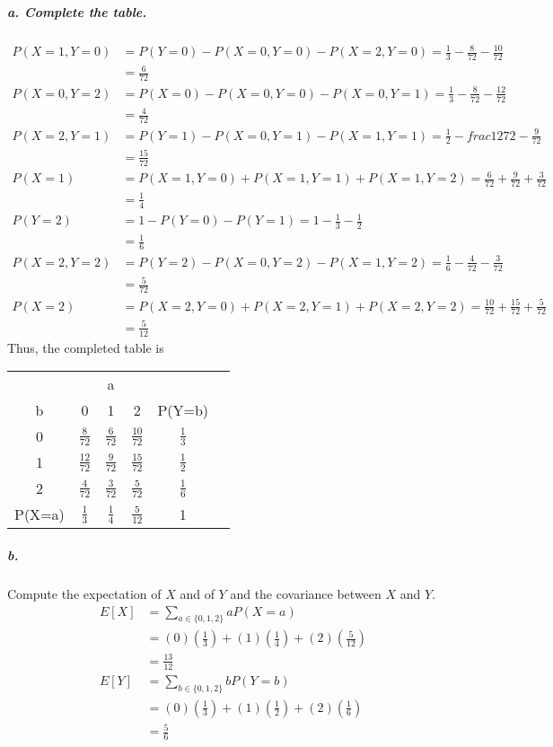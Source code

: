 \documentclass{article} %
\begin{document}
\subparagraph*{a. Complete the table.}
\begin{align*}
P(X=1, Y= 0) & = P(Y=0) - P(X= 0, Y = 0) - P(X = 2, Y = 0) = \frac{1}{3} - \frac{8}{72} - \frac{10}{72} \\
& = \frac{6}{72} \\
P(X = 0, Y = 2) & = P(X = 0) - P(X = 0, Y = 0) - P(X= 0, Y = 1) = \frac{1}{3} - \frac{8}{72} - \frac{12}{72} \\
& = \frac{4}{72} \\
P(X = 2, Y = 1) & = P(Y = 1) - P(X = 0, Y = 1) - P(X = 1, Y = 1) = \frac{1}{2} - frac{12}{72} - \frac{9}{72} \\
& = \frac{15}{72} \\
P(X = 1) & = P(X = 1, Y = 0) + P(X = 1, Y = 1) + P(X = 1, Y = 2) = \frac{6}{72} + \frac{9}{72} + \frac{3}{72} \\
& = \frac{1}{4} \\
P(Y = 2) &  = 1 - P(Y = 0) - P(Y = 1) = 1 - \frac{1}{3} - \frac{1}{2} \\
& = \frac{1}{6} \\
P(X = 2, Y = 2) & = P(Y = 2) - P(X = 0, Y = 2) - P(X = 1, Y = 2)  = \frac{1}{6} - \frac{4}{72} - \frac{3}{72} \\
& = \frac{5}{72} \\
P(X = 2) & = P(X = 2, Y = 0) + P(X = 2, Y = 1) + P(X = 2, Y = 2) = \frac{10}{72} + \frac{15}{72} + \frac{5}{72} \\
& = \frac{5}{12}
\end{align*}
Thus, the completed table is 
\begin{table}[h!]
\centering
\renewcommand{\arraystretch}{1.5}
\begin{tabular}{cccccc}
\hline \hline 
 &  \multicolumn{3}{c}{a} \\ \cline{2-4} 
b & 0 & 1 & 2 & P(Y=b) \\ \hline
0 & $\frac{8}{72}$ & $\frac{6}{72}$ & $\frac{10}{72}$ & $\frac{1}{3}$ \\ 
1 & $\frac{12}{72}$ & $\frac{9}{72}$ & $\frac{15}{72}$ & $\frac{1}{2}$ \\  
2 & $\frac{4}{72}$ & $\frac{3}{72}$ & $\frac{5}{72}$ & $\frac{1}{6}$ \\ \hline
P(X=a) & $\frac{1}{3}$ & $\frac{1}{4}$ &  $\frac{5}{12}$ & 1 \\ \hline \hline
\end{tabular}
\end{table}

\subparagraph*{b.} Compute the expectation of $X$ and of $Y$ and the covariance between $X$ and $Y$.  
\begin{align*}
E[X]  & = \sum_{a \in \{0, 1, 2\}} aP(X = a) \\
& = (0)(\frac{1}{3}) + (1)(\frac{1}{4}) + (2)(\frac{5}{12}) \\
& = \frac{13}{12} \\
E[Y] & = \sum_{b \in \{0, 1, 2\}} b P(Y=b) \\
& = (0)(\frac{1}{3}) + (1) (\frac{1}{2}) + (2)(\frac{1}{6}) \\
& = \frac{5}{6}
\end{align*}
\end{document}

